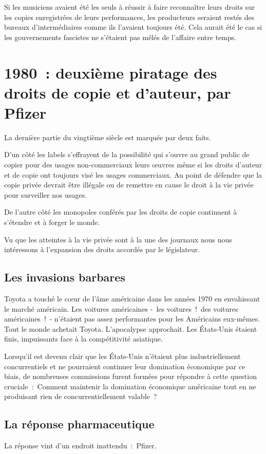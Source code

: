 Si les musiciens avaient été les seuls à réussir à faire reconnaître leurs droits sur les copies enregistrées de leurs performances, les producteurs seraient restés des bureaux
d'intermédiaires comme ils
l'avaient toujours été. Cela aurait été le cas si les gouvernements fascistes ne s'étaient pas mêlés de l'affaire entre temps.

\section{1980~: deuxième piratage des droits de copie et d'auteur, par Pfizer}
La dernière partie du vingtième siècle est marquée par deux faits. 

D'un côté les labels s'effrayent de la possibilité qui s'ouvre au grand public de copier pour des usages non-commerciaux leurs
œuvres même si les droits d'auteur et de copie ont toujours visé les usages commerciaux. Au point de défendre que la copie privée devrait être illégale ou de remettre en cause le droit à la vie
privée pour surveiller nos usages. 

De l'autre côté les monopoles conférés par les droits de copie continuent à s'étendre et à forger le monde. 

Vu que les atteintes à la vie privée sont à la une des
journaux nous nous intéressons à l'expansion des droits accordés par le législateur.
\subsection{Les invasions barbares}


Toyota a touché le cœur de l'âme américaine dans les années 1970 en envahissant le marché américain. Les voitures américaines -~les voitures~! des voitures américaines~!~- n'étaient pas assez
performantes pour les 
Américains eux-mêmes. Tout le monde achetait Toyota. L'apocalypse approchait. Les États-Unis étaient finis, impuissants face à la compétitivité asiatique.

Lorsqu'il est devenu clair que les États-Unis n'étaient plus industriellement concurrentiels et ne pourraient continuer leur domination économique par ce biais, de nombreuses commissions furent formées
pour
répondre à cette question cruciale~: Comment maintenir la domination économique américaine tout en ne produisant rien de concurrentiellement valable~?

\subsection{La réponse pharmaceutique}
La réponse vint d'un endroit inattendu~: Pfizer.

